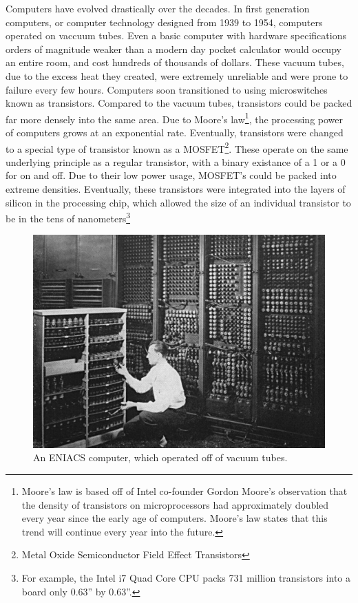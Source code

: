 \documentclass[10pt,journal,compsoc]{IEEEtran}
\begin{document}
Computers have evolved drastically over the decades. In first generation computers, or computer technology designed from 1939 to 1954, computers operated on vaccuum tubes. Even a basic computer with hardware specifications orders of magnitude weaker than a modern day pocket calculator would occupy an entire room, and cost hundreds of thousands of dollars\cite{URI}.
These vacuum tubes, due to the excess heat they created, were extremely unreliable and were prone to failure every few hours. Computers soon transitioned to using microswitches known as transistors.  Compared to the vacuum tubes, transistors could be packed far more densely into the same area. Due to Moore's law\footnote{Moore's law is based off of Intel co-founder Gordon Moore's observation that the density of transistors on microprocessors had approximately doubled every year since the early age of computers. Moore's law states that this trend will continue every year into the future.}, the processing power of computers grows at an exponential rate\cite{Moore}. Eventually, transistors were changed to a special type of transistor known as a MOSFET\footnote{Metal Oxide Semiconductor Field Effect Transistors}. These operate on the same underlying principle as a regular transistor, with a binary existance of a 1 or a 0 for on and off. Due to their low power usage, MOSFET's could be packed into extreme densities. Eventually, these transistors were integrated into the layers of silicon in the processing chip, which allowed the size of an individual transistor to be in the tens of nanometers\cite{Tom's}\footnote{For example, the Intel i7 Quad Core CPU packs 731 million transistors into a board only 0.63'' by 0.63''.}
\begin{figure}
\centering
\includegraphics[width=0.7\linewidth]{eniacsvacuum}
\caption[]{An ENIACS computer, which operated off of vacuum tubes.}
\label{fig:eniacsvacuum}
\end{figure}
\end{document}
